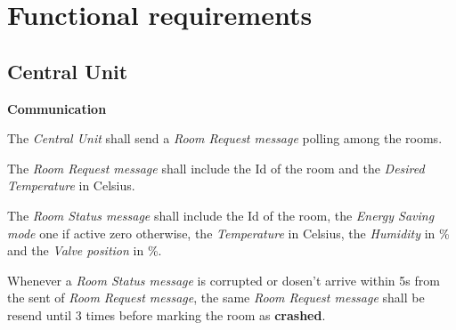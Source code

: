 \section{Functional requirements}
	\subsection{Central Unit}
		\begin{req_enum}
			\item \textbf{Communication}
				\begin{req_enum}[label*=\arabic*.]
					\item The \textit{Central Unit} shall send a \textit{Room Request message} polling among the rooms.
					\item The \textit{Room Request message} shall include the Id of the room and the \textit{Desired Temperature} in Celsius\degree.
					\item The \textit{Room Status message} shall include the Id of the room, the \textit{Energy Saving mode} one if active zero otherwise, the \textit{Temperature} in Celsius\degree, the \textit{Humidity} in \% and the \textit{Valve position} in \%.
					\item Whenever a \textit{Room Status message} is corrupted or dosen't arrive within 5s from the sent of \textit{Room Request message}, the same \textit{Room Request message} shall be resend until 3 times before marking the room as \textbf{crashed}.
				\end{req_enum}
		\end{req_enum}


